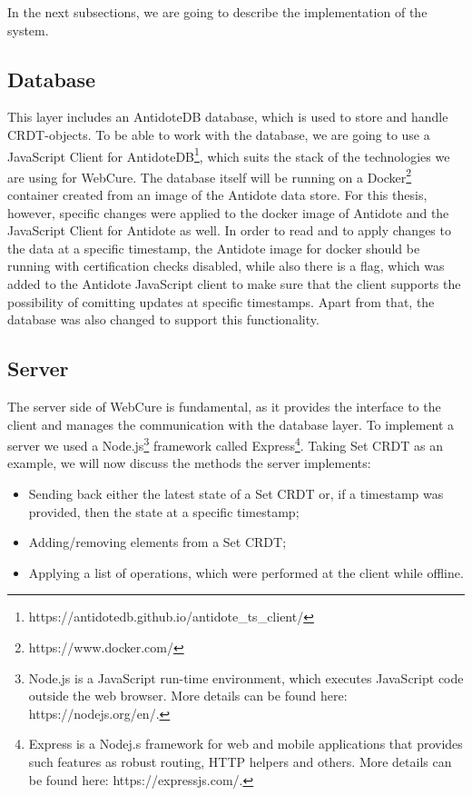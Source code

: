 In the next subsections, we are going to describe the implementation of the system.

\subsection{Database}

This layer includes an AntidoteDB database, which is used to store and handle CRDT-objects. To be able to work with the database, we are going to use a JavaScript Client for AntidoteDB\footnote{https://antidotedb.github.io/antidote\_ts\_client/}, which suits the stack of the technologies we are using for WebCure. The database itself will be running on a Docker\footnote{https://www.docker.com/} container created from an image of the Antidote data store. For this thesis, however, specific changes were applied to the docker image of Antidote and the JavaScript Client for Antidote as well. In order to read and to apply changes to the data at a specific timestamp, the Antidote image for docker should be running with certification checks disabled, while also there is a flag, which was added to the Antidote JavaScript client to make sure that the client supports the possibility of comitting updates at specific timestamps. Apart from that, the database was also changed to support this functionality.

\subsection{Server}
\label{impl-server}

The server side of WebCure is fundamental, as it provides the interface to the client and manages the communication with the database layer. To implement a server we used a Node.js\footnote{Node.js is a JavaScript run-time environment, which executes JavaScript code outside the web browser. More details can be found here: https://nodejs.org/en/.} framework called Express\footnote{Express is a Nodej.s framework for web and mobile applications that provides such features as robust routing, HTTP helpers and others. More details can be found here: https://expressjs.com/.}. Taking Set CRDT as an example, we will now discuss the methods the server implements:

\begin{itemize}
    \item {Sending back either the latest state of a Set CRDT or, if a timestamp was provided, then the state at a specific timestamp;}
    \item {Adding/removing elements from a Set CRDT;}
    \item {Applying a list of operations, which were performed at the client while offline.}
\end{itemize}

